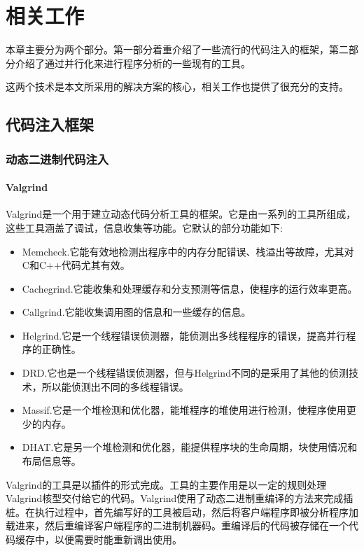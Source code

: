 
\chapter{相关工作}

本章主要分为两个部分。第一部分着重介绍了一些流行的代码注入的框架，第二部分介绍了通过并行化来进行程序分析的一些现有的工具。

这两个技术是本文所采用的解决方案的核心，相关工作也提供了很充分的支持。

\section{代码注入框架}
\subsection{动态二进制代码注入}
\subsubsection{Valgrind}

Valgrind\cite{valgrind}是一个用于建立动态代码分析工具的框架。它是由一系列的工具所组成，这些工具涵盖了调试，信息收集等功能。它默认的部分功能如下:

\begin{itemize}
	\item Memcheck.它能有效地检测出程序中的内存分配错误、栈溢出等故障，尤其对C和C++代码尤其有效。
	\item Cachegrind.它能收集和处理缓存和分支预测等信息，使程序的运行效率更高。
	\item Callgrind.它能收集调用图的信息和一些缓存的信息。
	\item Helgrind.它是一个线程错误侦测器，能侦测出多线程程序的错误，提高并行程序的正确性。
	\item DRD.它也是一个线程错误侦测器，但与Helgrind不同的是采用了其他的侦测技术，所以能侦测出不同的多线程错误。
	\item Massif.它是一个堆检测和优化器，能堆程序的堆使用进行检测，使程序使用更少的内存。
	\item DHAT.它是另一个堆检测和优化器，能提供程序块的生命周期，块使用情况和布局信息等。
\end{itemize}

Valgrind的工具是以插件的形式完成。工具的主要作用是以一定的规则处理Valgrind核型交付给它的代码。Valgrind使用了动态二进制重编译的方法来完成插桩。在执行过程中，首先编写好的工具被启动，然后将客户端程序即被分析程序加载进来，然后重编译客户端程序的二进制机器码。重编译后的代码被存储在一个代码缓存中，以便需要时能重新调出使用。

